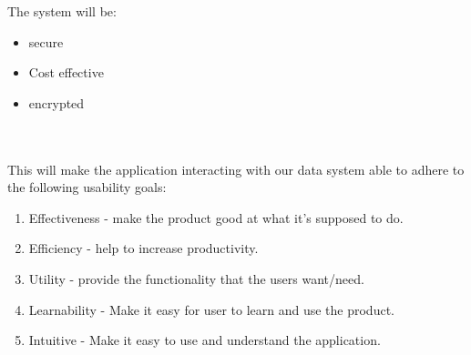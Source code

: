 
\newline
The system will be:
\begin{itemize}
	\item  secure 
	\item  Cost effective
	\item  encrypted
\end{itemize}
\newline \\ \\
This will make the application interacting with our data system able to adhere to the following usability goals:
\\
\begin{enumerate}
    \item Effectiveness - make the product good at what it’s supposed to do.
    \item Efficiency - help to increase productivity.
    \item Utility - provide the functionality that the users
    want/need.
    \item Learnability - Make it easy for user to learn and use the product.
    \item Intuitive - Make it easy to use and understand the application.
    
\end{enumerate}
